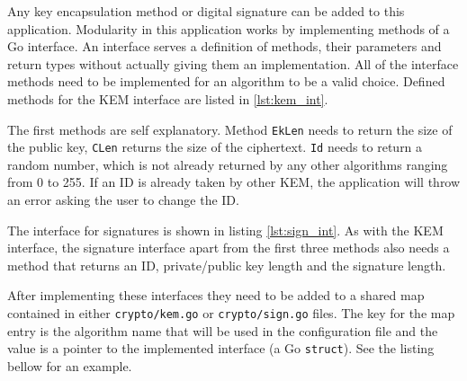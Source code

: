 Any key encapsulation method or digital signature can be added to this application. Modularity in this application works by implementing methods of a Go interface. An interface serves a definition of methods, their parameters and return types without actually giving them an implementation. All of the interface methods need to be implemented for an algorithm to be a valid choice. Defined methods for the KEM interface are listed in \ref{lst:kem_int}.

The first methods are self explanatory. Method \texttt{EkLen} needs to return the size of the public key, \texttt{CLen} returns the size of the ciphertext. \texttt{Id} needs to return a random number, which is not already returned by any other algorithms ranging from 0 to 255. If an ID is already taken by other KEM, the application will throw an error asking the user to change the ID.

The interface for signatures is shown in listing \ref{lst:sign_int}. As with the KEM interface, the signature interface apart from the first three methods also needs a method that returns an ID, private/public key length and the signature length.

After implementing these interfaces they need to be added to a shared map contained in either \texttt{crypto/kem.go} or \texttt{crypto/sign.go} files. The key for the map entry is the algorithm name that will be used in the configuration file and the value is a pointer to the implemented interface (a Go \texttt{struct}). See the listing bellow for an example.
